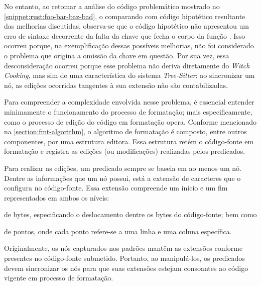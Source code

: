 \documentclass
  [11pt,a4paper,english,brazil,openright,sumario=tradicional,twoside]
  {abntex2}
\newcommand{\treesitter}{\textit{Tree-Sitter}\xspace}
\newcommand{\witchcooking}{\textit{Witch Cooking}\xspace}
\begin{document}
  No entanto, ao retomar a análise do código problemático mostrado no
  \cref{snippet:rust:foo-bar-baz-bad}, o comparando com código hipotético
  resultante das melhorias discutidas, observa-se que o código hipotético não
  apresentou um erro de sintaxe decorrente da falta da chave que fecha o corpo
  da função . Isso ocorreu porque, na exemplificação
  dessas possíveis melhorias, não foi considerado o problema que origina a
  omissão da chave em questão. Por sua vez, essa desconsideração ocorreu porque
  esse problema não deriva diretamente do \witchcooking, mas sim de uma
  característica do sistema \treesitter: ao sincronizar um nó, as edições
  ocorridas tangentes à sua extensão não são contabilizadas.

  Para compreender a complexidade envolvida nesse problema, é essencial
  entender minimamente o funcionamento do processo de formatação; mais
  especificamente, como o processo de edição do código em formatação opera.
  Conforme mencionado na \cref{section:fmt-algorithm}, o algoritmo de
  formatação é composto, entre outros componentes, por uma estrutura editora.
  Essa estrutura retém o código-fonte em formatação e registra as edições (ou
  modificações) realizadas pelos predicados.

  Para realizar as edições, um predicado sempre se baseia em ao menos um nó.
  Dentre as informações que um nó possui, está a extensão de caracteres que o
  configura no código-fonte. Essa extensão compreende um início e um fim
  representados em ambos os níveis:
  \begin{inparaenum}
    \item de bytes, especificando o deslocamento dentre os bytes do
          código-fonte; bem como
    \item de pontos, onde cada ponto refere-se a uma linha e uma coluna
          específica.
  \end{inparaenum}
  Originalmente, os nós capturados nos padrões mantêm as extensões conforme
  presentes no código-fonte submetido. Portanto, ao manipulá-los, os
  predicados devem sincronizar os nós para que suas extensões estejam
  consoantes ao código vigente em processo de formatação.
\end{document}
